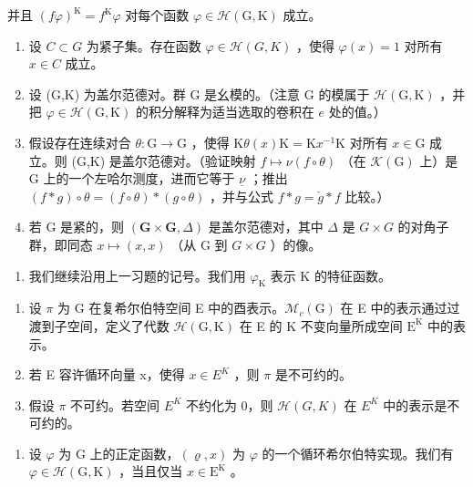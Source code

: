 并且 \((f\varphi)^{\mathrm{K}} = f^{\mathrm{K}}\varphi\) 对每个函数 \(\varphi \in \mathcal{H}(\mathrm{G},\mathrm{K})\) 成立。

\begin{enumerate}
\def\labelenumi{\alph{enumi})}
\setcounter{enumi}{2}
\item
  设 \(C \subset G\) 为紧子集。存在函数 \(\varphi \in \mathcal{H}(G, K)\) ，使得 \(\varphi(x) = 1\) 对所有 \(x \in C\) 成立。
\item
  设 (G,K) 为盖尔范德对。群 G 是幺模的。（注意 G 的模属于 \(\mathcal{H}(\mathrm{G},\mathrm{K})\) ，并把 \(\varphi \in \mathcal{H}(\mathrm{G},\mathrm{K})\) 的积分解释为适当选取的卷积在 \(e\) 处的值。）
\item
  假设存在连续对合 \(\theta\colon\mathrm{G}\to\mathrm{G}\) ，使得 \(\mathrm{K}\theta(x)\mathrm{K}=\mathrm{K}x^{-1}\mathrm{K}\) 对所有 \(x\in\mathrm{G}\) 成立。则 (G,K) 是盖尔范德对。（验证映射 \(f\mapsto\nu(f\circ\theta)\) （在 \(\mathcal{K}(\mathrm{G})\) 上）是 G 上的一个左哈尔测度，进而它等于 \(\underline{\nu}\) ；推出 \((f*g)\circ\theta=(f\circ\theta)*(g\circ\theta)\) ，并与公式 \(f*g=\check{g}*f\) 比较。）
\item
  若 G 是紧的，则 \((\mathbf{G} \times \mathbf{G}, \Delta)\) 是盖尔范德对，其中 \(\Delta\) 是 \(G \times G\) 的对角子群，即同态 \(x \mapsto (x, x)\) （从 G 到 \(G \times G\) ）的像。
\end{enumerate}

\begin{enumerate}
\def\labelenumi{\arabic{enumi})}
\setcounter{enumi}{25}
\tightlist
\item
  我们继续沿用上一习题的记号。我们用 \(\varphi_{\mathrm{K}}\) 表示 K 的特征函数。
\end{enumerate}

\begin{enumerate}
\def\labelenumi{\alph{enumi})}
\item
  设 \(\pi\) 为 G 在复希尔伯特空间 E 中的酉表示。\(\mathcal{M}_c(\mathrm{G})\) 在 E 中的表示通过过渡到子空间，定义了代数 \(\mathcal{H}(\mathrm{G},\mathrm{K})\) 在 E 的 K 不变向量所成空间 \(\mathrm{E}^{\mathrm{K}}\) 中的表示。
\item
  若 E 容许循环向量 x，使得 \(x \in E^{K}\) ，则 \(\pi\) 是不可约的。
\item
  假设 \(\pi\) 不可约。若空间 \(E^{K}\) 不约化为 0，则 \(\mathcal{H}(G,K)\) 在 \(E^{K}\) 中的表示是不可约的。
\end{enumerate}

\begin{enumerate}
\def\labelenumi{\alph{enumi})}
\setcounter{enumi}{3}
\tightlist
\item
  设 \(\varphi\) 为 G 上的正定函数，\((\varrho, x)\) 为 \(\varphi\) 的一个循环希尔伯特实现。我们有 \(\varphi \in \mathcal{H}(\mathrm{G}, \mathrm{K})\) ，当且仅当 \(x \in \mathrm{E}^{\mathrm{K}}\) 。
\end{enumerate}


